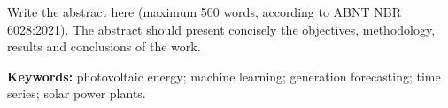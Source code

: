 Write the abstract here (maximum 500 words, according to ABNT NBR 6028:2021).
The abstract should present concisely the objectives, methodology, results and
conclusions of the work.

\vspace{1cm}
\noindent\textbf{Keywords:} photovoltaic energy; machine learning;
generation forecasting; time series; solar power plants.
